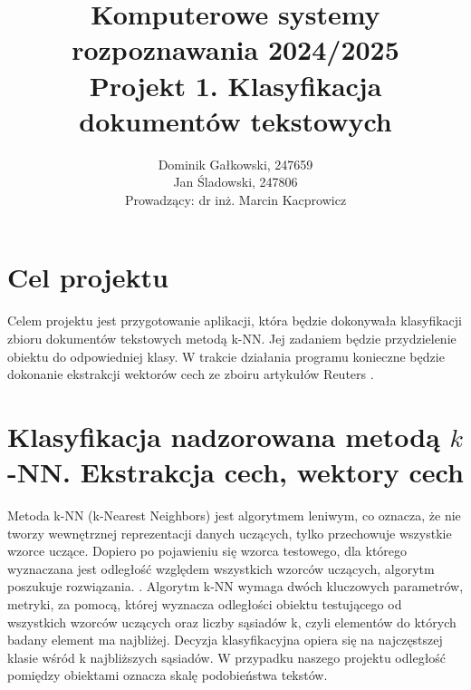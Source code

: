 \documentclass{article}
\author{
	{Dominik Gałkowski, 247659} \\
	{Jan Śladowski, 247806}\\ 
{Prowadzący: dr inż. Marcin Kacprowicz}
}
\title{Komputerowe systemy rozpoznawania 2024/2025\\Projekt 1. Klasyfikacja dokumentów tekstowych}
\begin{document}
\maketitle


\section{Cel projektu}
\indent Celem projektu jest przygotowanie aplikacji, która będzie dokonywała klasyfikacji zbioru dokumentów tekstowych metodą k-NN. Jej zadaniem będzie przydzielenie obiektu do odpowiedniej klasy. W trakcie działania programu konieczne będzie dokonanie ekstrakcji wektorów cech ze zboiru artykułów Reuters \cite{reuters}. \\

\section{Klasyfikacja nadzorowana metodą $k$-NN.  Ekstrakcja cech, wektory cech}
Metoda k-NN (k-Nearest Neighbors) jest algorytmem leniwym, co oznacza, że nie tworzy wewnętrznej reprezentacji danych uczących, tylko przechowuje wszystkie wzorce uczące. Dopiero po pojawieniu się wzorca testowego, dla którego wyznaczana jest odległość względem wszystkich wzorców uczących, algorytm poszukuje rozwiązania. \cite{knn}. Algorytm k-NN wymaga dwóch kluczowych parametrów, metryki, za pomocą, której wyznacza odległości obiektu testującego od wszystkich wzorców uczących oraz liczby sąsiadów k, czyli elementów do których badany element ma najbliżej. Decyzja klasyfikacyjna opiera się na najczęstszej klasie wśród k najbliższych sąsiadów. W przypadku naszego projektu odległość pomiędzy obiektami oznacza skalę podobieństwa tekstów.
\end{document}
